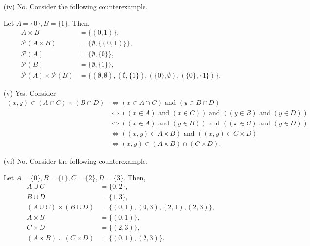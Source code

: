 \documentclass[10pt]{article}
\renewcommand{\land}{\text{ and }}
\begin{document}
\begin{enumerate}
        \item[(iv)] No. Consider the following counterexample.

        Let $A = \{0\}, B = \{1\}$. Then, \begin{align*}
            A\times B &= \{(0, 1)\}, \\
            \mathcal{P}(A\times B) &= \{\emptyset, \{(0, 1)\}\}, \\
            \mathcal{P}(A) &= \{\emptyset, \{0\}\}, \\
            \mathcal{P}(B) &= \{\emptyset, \{1\}\}, \\
            \mathcal{P}(A) \times \mathcal{P}(B) &= \{(\emptyset, \emptyset),
            (\emptyset, \{1\}), (\{0\}, \emptyset), (\{0\}, \{1\})\}.
        \end{align*}


        \item[(v)] Yes. Consider \begin{align*}
            (x, y) \in (A \cap C) \times (B \cap D)
            &\iff (x \in A \cap C) \land (y \in B \cap D) \\
            &\iff ((x \in A) \land (x \in C)) \land ((y \in B) \land (y \in D)) \\
            &\iff ((x \in A) \land (y \in B)) \land ((x \in C) \land (y \in D)) \\
            &\iff ((x, y) \in A\times B) \land ((x, y) \in C \times D) \\
            &\iff (x, y) \in (A\times B) \cap (C \times D). \tag*{\qed}
        \end{align*}


        \item[(vi)] No. Consider the following counterexample.

        Let $A = \{0\}, B = \{1\}, C = \{2\}, D = \{3\}$. Then,
        \begin{align*}
            A \cup C &= \{0, 2\}, \\
            B \cup D &= \{1, 3\}, \\
            (A \cup C) \times (B \cup D) &= \{(0, 1), (0, 3), (2, 1), (2, 3)\}, \\
            A \times B &= \{(0, 1)\}, \\
            C \times D &= \{(2, 3)\}, \\
            (A \times B) \cup (C \times D) &= \{(0, 1), (2, 3)\}.
        \end{align*}
    \end{enumerate}
\end{document}
